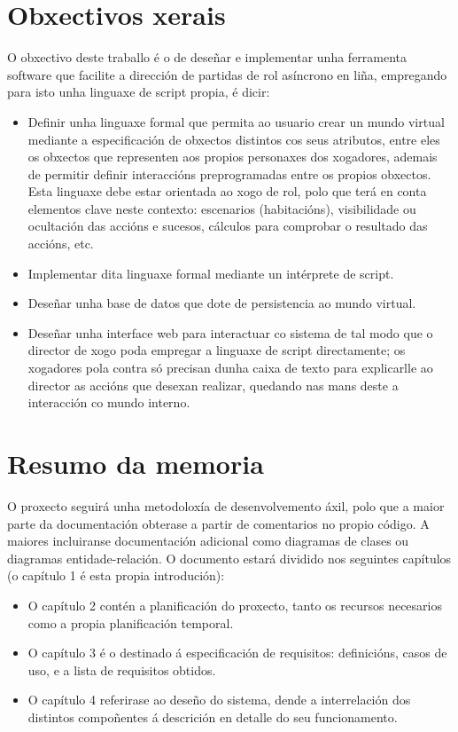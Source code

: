 \section{Obxectivos xerais}
O obxectivo deste traballo é o de deseñar e implementar unha ferramenta software
que facilite a dirección de partidas de rol asíncrono en liña, empregando para
isto unha linguaxe de script propia, é dicir:
\begin{itemize}
  \item Definir unha linguaxe formal que permita ao usuario crear un mundo virtual
  mediante a especificación de obxectos distintos cos seus atributos, entre eles
  os obxectos que representen aos propios personaxes dos xogadores, ademais de
  permitir definir interaccións preprogramadas entre os propios obxectos. Esta
  linguaxe debe estar orientada ao xogo de rol, polo que terá en conta elementos
  clave neste contexto: escenarios (habitacións), visibilidade ou ocultación das
  accións e sucesos, cálculos para comprobar o resultado das accións, etc.
  \item Implementar dita linguaxe formal mediante un intérprete de script.
  \item Deseñar unha base de datos que dote de persistencia ao mundo virtual.
  \item Deseñar unha interface web para interactuar co sistema de tal modo que o
  director de xogo poda empregar a linguaxe de script directamente; os
  xogadores pola contra só precisan dunha caixa de texto para explicarlle ao
  director as accións que desexan realizar, quedando nas mans deste a
  interacción co mundo interno.
\end{itemize}

\section{Resumo da memoria}
O proxecto seguirá unha metodoloxía de desenvolvemento áxil, polo que a maior
parte da documentación obterase a partir de comentarios no propio código. A
maiores incluiranse documentación adicional como diagramas de clases
ou diagramas entidade-relación. O documento estará dividido nos seguintes
capítulos (o capítulo 1 é esta propia introdución):
\begin{itemize}
  \item O capítulo 2 contén a planificación do proxecto, tanto os recursos
  necesarios como a propia planificación temporal.
  \item O capítulo 3 é o destinado á especificación de requisitos:
  definicións, casos de uso, e a lista de requisitos obtidos.
  \item O capítulo 4 referirase ao deseño do sistema, dende a interrelación dos
  distintos compoñentes á descrición en detalle do seu funcionamento.
\end{itemize}